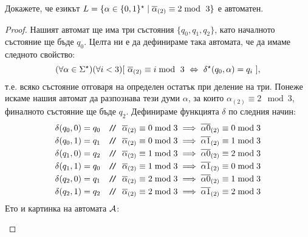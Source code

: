 \begin{problem}\label{prob:regular:dfa:binary}
  Докажете, че езикът $L = \{\alpha \in \{0,1\}^\star \mid \overline{\alpha}_{(2)} \equiv 2 \bmod\ 3\}$
  е автоматен.
\end{problem}
\begin{proof}
  Нашият автомат ще има три състояния $\{q_0,q_1,q_2\}$, като началното състояние ще бъде $q_0$.
  Целта ни е да дефинираме така автомата, че да имаме следното свойство:
  \begin{equation}
    (\forall\alpha\in\Sigma^\star)(\forall i < 3)[\ \bin{\alpha} \equiv i \bmod\ 3\ \Leftrightarrow\ \delta^\star(q_0,\alpha) = q_i\ ],
  \end{equation}
  т.е. всяко състояние отговаря на определен остатък при деление на три.
  Понеже искаме нашия автомат да разпознава тези думи $\alpha$,
  за които $\alpha_{(2)} \equiv 2\mod 3$, финалното състояние ще бъде $q_2$.
  Дефинираме функцията $\delta$ по следния начин:
  \begin{align*}
    & \delta(q_0,0) = q_0 & \texttt{/}\!\texttt{/}\ {\ \overline{\alpha}_{(2)} \equiv 0 \bmod 3 \implies \overline{\alpha 0}_{(2)} \equiv 0 \bmod 3 }\\
    & \delta(q_0,1) = q_1 & \texttt{/}\!\texttt{/}\ {\ \overline{\alpha}_{(2)} \equiv 0 \bmod 3 \implies \overline{\alpha 1}_{(2)} \equiv 1 \bmod 3 }\\
    & \delta(q_1,0) = q_2 & \texttt{/}\!\texttt{/}\ {\ \overline{\alpha}_{(2)} \equiv 1 \bmod 3 \implies \overline{\alpha 0}_{(2)} \equiv 2 \bmod 3 }\\
    & \delta(q_1,1) = q_0 & \texttt{/}\!\texttt{/}\ {\ \overline{\alpha}_{(2)} \equiv 1 \bmod 3 \implies \overline{\alpha 1}_{(2)} \equiv 0 \bmod 3 }\\
    & \delta(q_2,0) = q_1 & \texttt{/}\!\texttt{/}\ {\ \overline{\alpha}_{(2)} \equiv 2 \bmod 3 \implies \overline{\alpha 0}_{(2)} \equiv 1 \bmod 3 }\\
    & \delta(q_2,1) = q_2 & \texttt{/}\!\texttt{/}\ {\ \overline{\alpha}_{(2)} \equiv 2 \bmod 3 \implies \overline{\alpha 1}_{(2)} \equiv 2 \bmod 3 }
  \end{align*}
  Ето и картинка на автомата $\mathcal{A}$:
  \begin{figure}[H]
    \begin{center}
\end{center}
\end{figure}
\end{proof}
